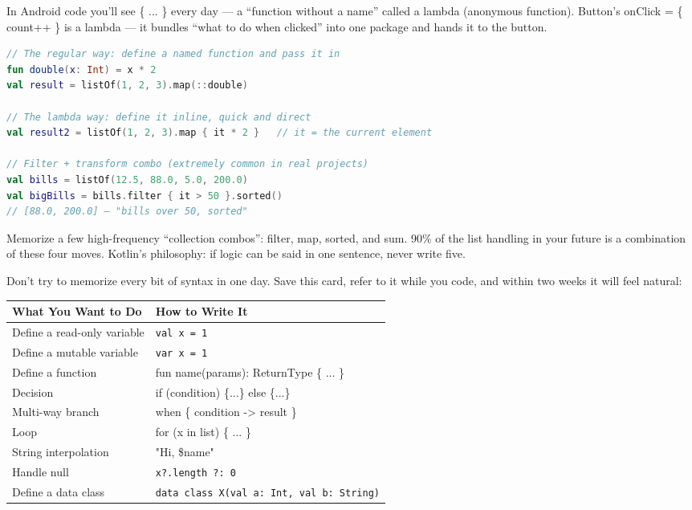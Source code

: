 
In Android code you'll see \{ ... \} every day — a “function without a name” called a lambda (anonymous function). Button's onClick = \{ count++ \} is a lambda — it bundles “what to do when clicked” into one package and hands it to the button.

\begin{lstlisting}[language=Kotlin]
// The regular way: define a named function and pass it in
fun double(x: Int) = x * 2
val result = listOf(1, 2, 3).map(::double)

// The lambda way: define it inline, quick and direct
val result2 = listOf(1, 2, 3).map { it * 2 }   // it = the current element

// Filter + transform combo (extremely common in real projects)
val bills = listOf(12.5, 88.0, 5.0, 200.0)
val bigBills = bills.filter { it > 50 }.sorted()
// [88.0, 200.0] — "bills over 50, sorted"
\end{lstlisting}

Memorize a few high-frequency “collection combos”: filter, map, sorted, and sum. 90\% of the list handling in your future is a combination of these four moves. Kotlin's philosophy: if logic can be said in one sentence, never write five.


Don't try to memorize every bit of syntax in one day. Save this card, refer to it while you code, and within two weeks it will feel natural:

\begin{center}
\begin{tabularx}{\linewidth}{|X|X|}
\hline
\textbf{What You Want to Do} & \textbf{How to Write It} \tabularnewline
\hline
Define a read-only variable & \texttt{val x = 1} \tabularnewline
Define a mutable variable & \texttt{var x = 1} \tabularnewline
Define a function & fun name(params): ReturnType \{ ... \} \tabularnewline
Decision & if (condition) \{...\} else \{...\} \tabularnewline
Multi-way branch & when \{ condition -> result \} \tabularnewline
Loop & for (x in list) \{ ... \} \tabularnewline
String interpolation & "Hi, \$name" \tabularnewline
Handle null & \texttt{x?.\allowbreak length ?: 0} \tabularnewline
Define a data class & \texttt{data class X(val a: Int, val b: String)} \tabularnewline
\hline
\end{tabularx}
\end{center}

